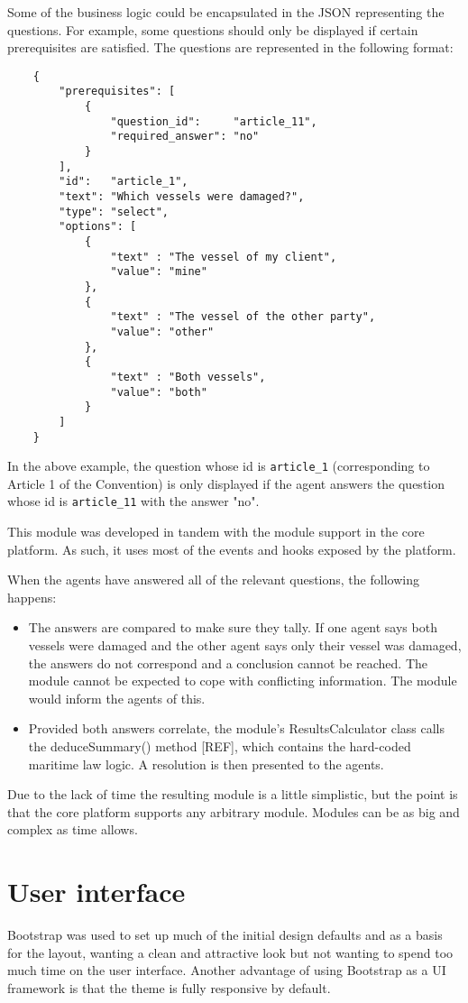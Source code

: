 Some of the business logic could be encapsulated in the JSON representing the questions. For example, some questions should only be displayed if certain prerequisites are satisfied. The questions are represented in the following format:

\begin{lstlisting}
    {
        "prerequisites": [
            {
                "question_id":     "article_11",
                "required_answer": "no"
            }
        ],
        "id":   "article_1",
        "text": "Which vessels were damaged?",
        "type": "select",
        "options": [
            {
                "text" : "The vessel of my client",
                "value": "mine"
            },
            {
                "text" : "The vessel of the other party",
                "value": "other"
            },
            {
                "text" : "Both vessels",
                "value": "both"
            }
        ]
    }
\end{lstlisting}

In the above example, the question whose id is \lstinline{article_1} (corresponding to Article 1 of the Convention) is only displayed if the agent answers the question whose id is \lstinline{article_11} with the answer "no".

This module was developed in tandem with the module support in the core platform. As such, it uses most of the events and hooks exposed by the platform.

When the agents have answered all of the relevant questions, the following happens:

\begin{itemize}
    \item The answers are compared to make sure they tally. If one agent says both vessels were damaged and the other agent says only their vessel was damaged, the answers do not correspond and a conclusion cannot be reached. The module cannot be expected to cope with conflicting information. The module would inform the agents of this.
    \item Provided both answers correlate, the module's ResultsCalculator class calls the deduceSummary() method [REF], which contains the hard-coded maritime law logic. A resolution is then presented to the agents.
\end{itemize}

Due to the lack of time the resulting module is a little simplistic, but the point is that the core platform supports any arbitrary module. Modules can be as big and complex as time allows.

\section{User interface}

Bootstrap was used to set up much of the initial design defaults and as a basis for the layout, wanting a clean and attractive look but not wanting to spend too much time on the user interface. Another advantage of using Bootstrap as a UI framework is that the theme is fully responsive by default.